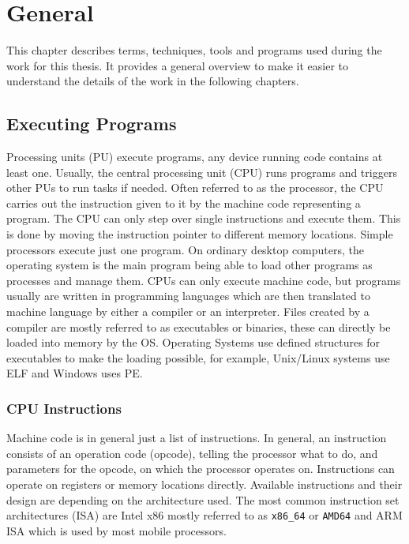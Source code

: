 \chapter{General}\label{sec:general}

This chapter describes terms, techniques, tools and programs used during the
work for this thesis. It provides a general overview to make it easier to
understand the details of the work in the following chapters.

\section{Executing Programs}

Processing units (PU) execute programs, any device running code contains at
least one. Usually, the central processing unit (CPU) runs programs and triggers
other PUs to run tasks if needed. Often referred to as the processor, the CPU
carries out the instruction given to it by the machine code representing a
program. The CPU can only step over single instructions and execute them. This
is done by moving the instruction pointer to different memory locations. Simple
processors execute just one program. On ordinary desktop computers, the
operating system is the main program being able to load other programs as
processes and manage them. CPUs can only execute machine code, but programs
usually are written in programming languages which are then translated to
machine language by either a compiler or an interpreter. Files created by a
compiler are mostly referred to as executables or binaries, these can directly
be loaded into memory by the OS. Operating Systems use defined structures for
executables to make the loading possible, for example, Unix/Linux systems use
ELF and Windows uses PE.

\subsection{CPU Instructions}

Machine code is in general just a list of instructions. In general, an
instruction consists of an operation code (opcode), telling the processor what
to do, and parameters for the opcode, on which the processor operates on.
Instructions can operate on registers or memory locations directly. Available
instructions and their design are depending on the architecture used. The most
common instruction set architectures (ISA) are Intel x86 mostly referred to as
\texttt{x86\_64} or \texttt{AMD64} and ARM ISA which is used by most mobile
processors.

